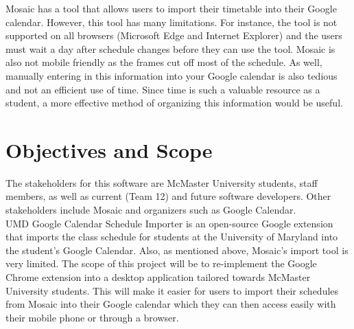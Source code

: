 \documentclass{article}
\begin{document}
Mosaic has a tool that allows users to import their timetable into their Google calendar. \color{blue}However, this tool has many limitations. For instance, the tool is not supported on all browsers (Microsoft Edge and Internet Explorer) and the users must wait a day after schedule changes before they can use the tool. Mosaic is also not mobile friendly as the frames cut off most of the schedule. As well, manually entering in this information into your Google calendar is also tedious and not an efficient use of time. \color{black} Since time is such a valuable resource as a student, a more effective method of organizing this information would be useful.


\section{Objectives and Scope}
\hspace{5mm}The stakeholders for this software are McMaster University students, staff members, as well as current (Team 12) and future software developers. Other stakeholders include Mosaic and organizers such as Google Calendar.\\

\color{blue} UMD Google Calendar Schedule Importer is an open-source Google extension that imports the class schedule for students at the University of Maryland into the student's Google Calendar. Also, as mentioned above, Mosaic's import tool is very limited. The scope of this project will be to re-implement the Google Chrome extension into a  desktop application tailored towards McMaster University students. \color{black} This will make it easier for users to import their schedules from Mosaic into their Google calendar which they can then access easily with their mobile phone or through a browser.






\end{document}
